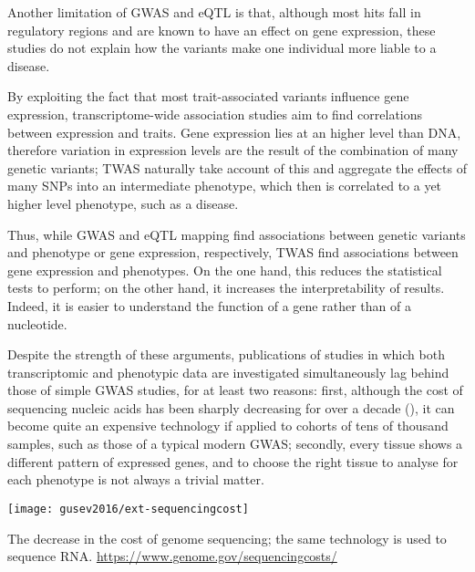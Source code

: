 \documentclass[../main.tex]{subfiles}
\begin{document}
Another limitation of GWAS and eQTL is that, although most hits fall in 
regulatory regions and are known to have an effect on gene expression, 
these studies do not explain how the variants make one individual more 
liable to a disease. 


By exploiting the fact that most trait-associated variants influence 
gene expression, transcriptome-wide association studies aim to find 
correlations between expression and traits. Gene expression lies at an 
higher level than DNA, therefore variation in expression levels are the 
result of the combination of many genetic variants; TWAS naturally take 
account of this and aggregate the effects of many SNPs into an 
intermediate phenotype, which then is correlated to a yet higher level 
phenotype, such as a disease.

Thus, while GWAS and eQTL mapping find associations between genetic 
variants and phenotype or gene expression, respectively, TWAS find 
associations between gene expression and phenotypes. On the one hand, 
this reduces the statistical tests to perform; on the other hand, it 
increases the interpretability of results. Indeed, it is easier to 
understand the function of a gene rather than of a nucleotide.

Despite the strength of these arguments, publications of studies in 
which both transcriptomic and phenotypic data are investigated 
simultaneously lag behind those of simple GWAS studies, for at least two 
reasons: first, although the cost of sequencing nucleic acids has been 
sharply decreasing for over a decade (), it can 
become quite an expensive technology if applied to cohorts of tens of 
thousand samples, such as those of a typical modern GWAS; secondly, 
every tissue shows a different pattern of expressed genes, and to choose 
the right tissue to analyse for each phenotype is not always a trivial 
matter.

\begin{marginfigure}[-4cm]
	\texttt{[image: gusev2016/ext-sequencingcost]}
	\caption{The decrease in the cost of genome sequencing; the same 
technology is used to sequence RNA. 
\url{https://www.genome.gov/sequencingcosts/}}
\end{marginfigure}
\end{document}
